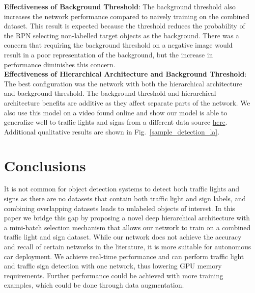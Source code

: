 \documentclass[10pt, conference, compsocconf]{IEEEtran}
\newcommand{\fig}[1]{Fig.~\ref{#1}}
\begin{document}
\noindent\textbf{Effectiveness of Background Threshold}: The background threshold also increases the network performance compared to naively training on the combined dataset. This result is expected because the threshold reduces the probability of the RPN selecting non-labelled target objects as the background. There was a concern that requiring the background threshold on a negative image would result in a poor representation of the background, but the increase in performance diminishes this concern. \\

\noindent\textbf{Effectiveness of Hierarchical Architecture and Background Threshold}: The best configuration was the network with both the hierarchical architecture and background threshold. The background threshold and hierarchical architecture benefits are additive as they affect separate parts of the network. We also use this model on a video \cite{la_video} found online and show our model is able to generalize well to traffic lights and signs from a different data source \href{https://www.youtube.com/watch?v=_YmogPzBXOw&feature=youtu.be}{here}. Additional qualitative results are shown in \fig{sample_detection_la}.

\section{Conclusions} \label{conclusion}
It is not common for object detection systems to detect both traffic lights and signs as there are no datasets that contain both traffic light and sign labels, and combining overlapping datasets leads to unlabeled objects of interest. In this paper we bridge this gap by proposing a novel deep hierarchical architecture with a mini-batch selection mechanism that allows our network to train on a combined traffic light and sign dataset. While our network does not achieve the accuracy and recall of certain networks in the literature, it is more suitable for autonomous car deployment. We achieve real-time performance and can perform traffic light and traffic sign detection with one network, thus lowering GPU memory requirements. Further performance could be achieved with more training examples, which could be done through data augmentation.

{\small


}
\end{document}
